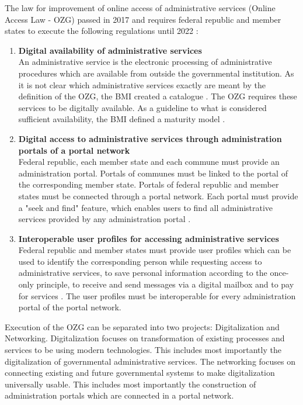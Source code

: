 \documentclass[
     12pt,         %
     a4paper,      %
     BCOR=10mm,version=first,     %
     DIV=14,version=first,        %
     ]{scrreprt}
\begin{document}
The law for improvement of online access of administrative services (Online Access Law - OZG) passed in 2017 and requires federal republic and member states to execute the following regulations until 2022 \cite{BMI:OZG_Wortlaut}:
\begin{enumerate}
    \item \textbf{Digital availability of administrative services} \\
    An administrative service is the electronic processing of administrative procedures which are available from outside the governmental institution.  As it is not clear which administrative services exactly are meant by the definition of the OZG, the BMI created a catalogue \cite{BMI:Verwaltungsleistungen}. The OZG requires these services to be digitally available. As a guideline to what is considered sufficient availability, the BMI defined a maturity model \cite{BMI:Digitale_Services}.
    \item \textbf{Digital access to administrative services through administration portals of a portal network} \\
    Federal republic, each member state and each commune must provide an administration portal. Portals of communes must be linked to the portal of the corresponding member state. Portals of federal republic and member states must be connected through a portal network. \cite{BMI:Portalverbund} Each portal must provide a "seek and find" feature, which enables users to find all administrative services provided by any administration portal \cite{Cotar:Drucksache_19/19089}. 
    \item \textbf{Interoperable user profiles for accessing administrative services} \\
    Federal republic and member states must provide user profiles which can be used to identify the corresponding person while requesting access to administrative services, to save personal information according to the once-only principle, to receive and send messages via a digital mailbox and to pay for services \cite{Cotar:Drucksache_19/19089}. The user profiles must be interoperable for every administration portal of the portal network.
\end{enumerate}

Execution of the OZG can be separated into two projects: Digitalization and Networking. Digitalization focuses on transformation of existing processes and services to be using modern technologies. This includes most importantly the digitalization of governmental administrative services. The networking focuses on connecting existing and future governmental systems to make digitalization universally usable. This includes most importantly the construction of administration portals which are connected in a portal network.
\end{document}

